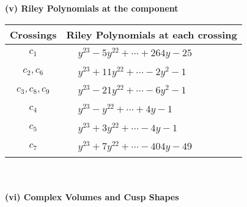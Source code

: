 \documentclass[1p]{elsarticle_modified}
\theoremstyle{definition}
\begin{document}
\newpage\renewcommand{\arraystretch}{1}
\flushleft \textbf{(v) Riley Polynomials at the component}\newline \\
\begin{tabular}{m{50pt}|m{274pt}}
Crossings & \hspace{64pt}Riley Polynomials at each crossing \\
\hline $$\begin{aligned}c_{1}\end{aligned}$$&$\begin{aligned}
&y^{23}-5 y^{22}+\cdots+264 y-25
\end{aligned}$\\
\hline $$\begin{aligned}c_{2},c_{6}\end{aligned}$$&$\begin{aligned}
&y^{23}+11 y^{22}+\cdots-2 y^2-1
\end{aligned}$\\
\hline $$\begin{aligned}c_{3},c_{8},c_{9}\end{aligned}$$&$\begin{aligned}
&y^{23}-21 y^{22}+\cdots-6 y^2-1
\end{aligned}$\\
\hline $$\begin{aligned}c_{4}\end{aligned}$$&$\begin{aligned}
&y^{23}- y^{22}+\cdots+4 y-1
\end{aligned}$\\
\hline $$\begin{aligned}c_{5}\end{aligned}$$&$\begin{aligned}
&y^{23}+3 y^{22}+\cdots-4 y-1
\end{aligned}$\\
\hline $$\begin{aligned}c_{7}\end{aligned}$$&$\begin{aligned}
&y^{23}+7 y^{22}+\cdots-404 y-49
\end{aligned}$\\
\hline
\end{tabular}\\~\\
\newpage\flushleft \textbf{(vi) Complex Volumes and Cusp Shapes}
\end{document}
